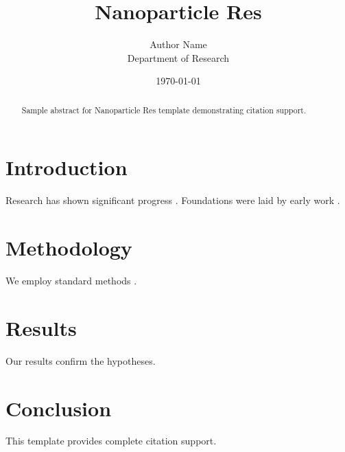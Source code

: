 \documentclass{llncs}
\title{Nanoparticle Res}
\author{Author Name \\ \small Department of Research}
\date{\today}
\begin{document}
\maketitle

\begin{abstract}
Sample abstract for Nanoparticle Res template demonstrating citation support.
\end{abstract}

\section{Introduction}
Research has shown significant progress \citep{einstein1905}. Foundations were laid by early work \citep{turing1950}.

\section{Methodology}
We employ standard methods \citep{knuth1984}.

\section{Results}
Our results confirm the hypotheses.

\section{Conclusion}
This template provides complete citation support.



\end{document}
